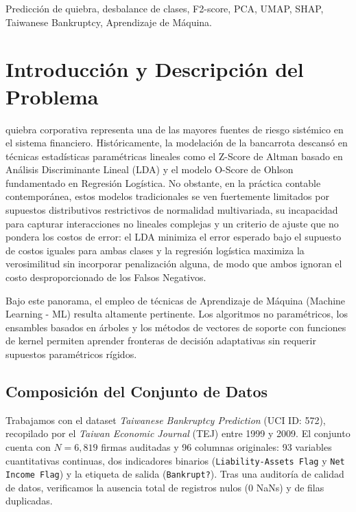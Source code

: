 \documentclass[journal]{IEEEtran}
\begin{document}
\begin{IEEEkeywords}
Predicción de quiebra, desbalance de clases, F2-score, PCA, UMAP, SHAP, Taiwanese Bankruptcy, Aprendizaje de Máquina.
\end{IEEEkeywords}

\section{Introducción y Descripción del Problema}
 quiebra corporativa representa una de las mayores fuentes de riesgo sistémico en el sistema financiero. Históricamente, la modelación de la bancarrota descansó en técnicas estadísticas paramétricas lineales como el Z-Score de Altman \cite{altman1968financial} basado en Análisis Discriminante Lineal (LDA) y el modelo O-Score de Ohlson \cite{ohlson1980financial} fundamentado en Regresión Logística. No obstante, en la práctica contable contemporánea, estos modelos tradicionales se ven fuertemente limitados por supuestos distributivos restrictivos de normalidad multivariada, su incapacidad para capturar interacciones no lineales complejas y un criterio de ajuste que no pondera los costos de error: el LDA minimiza el error esperado bajo el supuesto de costos iguales para ambas clases y la regresión logística maximiza la verosimilitud sin incorporar penalización alguna, de modo que ambos ignoran el costo desproporcionado de los Falsos Negativos.

Bajo este panorama, el empleo de técnicas de Aprendizaje de Máquina (Machine Learning - ML) resulta altamente pertinente. Los algoritmos no paramétricos, los ensambles basados en árboles y los métodos de vectores de soporte con funciones de kernel permiten aprender fronteras de decisión adaptativas sin requerir supuestos paramétricos rígidos.

\subsection{Composición del Conjunto de Datos}
Trabajamos con el dataset \textit{Taiwanese Bankruptcy Prediction} (UCI ID: 572), recopilado por el \textit{Taiwan Economic Journal} (TEJ) entre 1999 y 2009. El conjunto cuenta con $N = 6,819$ firmas auditadas y 96 columnas originales: 93 variables cuantitativas continuas, dos indicadores binarios (\texttt{Liability-Assets Flag} y \texttt{Net Income Flag}) y la etiqueta de salida (\texttt{Bankrupt?}). Tras una auditoría de calidad de datos, verificamos la ausencia total de registros nulos (0 NaNs) y de filas duplicadas. 
\end{document}
